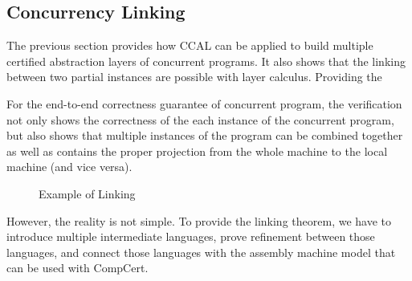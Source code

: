 \subsection{Concurrency Linking}
\label{subsec:concurrency-linking}

The previous section provides how CCAL can be applied to build multiple certified abstraction layers of concurrent programs.
It also shows that 
the linking between two partial instances are possible with layer calculus. 
Providing the 

For the end-to-end correctness guarantee of concurrent program, 
the verification not only shows the correctness of the each instance of the concurrent program, but also shows that 
multiple instances of the program can be combined together as well as contains the proper projection 
from the whole machine to the local machine (and vice versa).


\begin{figure}
\caption{Example of Linking}
\label{fig:overview-example}
\end{figure}

%
%
%


However, the reality is not simple. 
To provide the linking theorem, 
we have to introduce multiple intermediate languages, 
prove refinement between those languages, 
and connect those languages with the assembly machine model that can be used with CompCert. 

%
%



